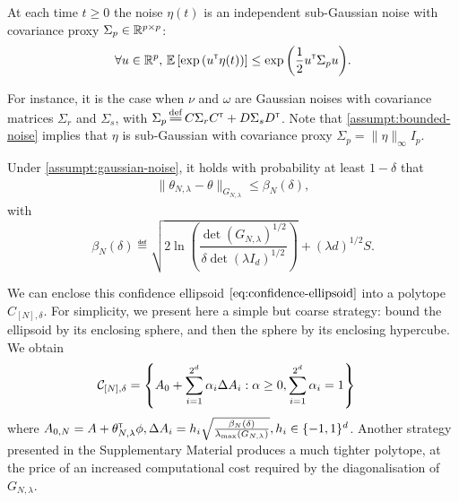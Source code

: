 \begin{assumption}
	\label{assumpt:gaussian-noise}
	\begin{leftbar}[assumptionbar]
	At each time $t\geq0$ the noise $\eta(t)$ is an independent sub-Gaussian noise with covariance proxy $\Sigma_p \in \mathbb{R}^{p\times p}$:
	\begin{equation*}
	\forall u\in\mathbb{R}^p,\, \operatorname*{\mathbb{E}} \left[ \exp{\left( u^{\mathsf{\scriptscriptstyle T}}\eta(t)\right)}\right] \leq \exp{\left( \frac{1}{2} u^{\mathsf{\scriptscriptstyle T}}\Sigma_p u\right)}.
	\end{equation*}
	\end{leftbar}
\end{assumption}
For instance, it is the case when $\nu$ and $\omega$ are Gaussian noises with covariance matrices $\Sigma_r$ and $\Sigma_s$, with $\Sigma_p \eqdef C\Sigma_r C^\transp + D\Sigma_s D^\transp$. Note that \autoref{assumpt:bounded-noise} implies that $\eta$ is sub-Gaussian with covariance proxy $\Sigma_p=\|\eta\|_\infty I_p$.

\begin{theorem}
	\label{thm:confidence_ellipsoid}
	\begin{leftbar}[theorembar]
	Under \autoref{assumpt:gaussian-noise}, it holds with probability at least $1-\delta$ that
	\begin{align}
	\label{eq:confidence-ellipsoid}
	\| \theta_{N,\lambda}  - \theta\|_{G_{N,\lambda}} \leq \beta_N(\delta),
	\end{align}
	with
	\begin{equation}
	\label{eq:beta_n}
	\beta_N(\delta)\eqdef \sqrt{2\ln \left(\frac{\det(G_{N,\lambda})^{1/2}}{\delta\det(\lambda I_d)^{1/2}}\right)}
	+ (\lambda d)^{1/2}S.
	\end{equation}
	\end{leftbar}
\end{theorem}

We can enclose this confidence ellipsoid $\eqref{eq:confidence-ellipsoid}$ into a polytope $C_{[N],\delta}$. For simplicity, we present here a simple but coarse strategy: bound the ellipsoid by its enclosing sphere, and then the sphere by its enclosing hypercube. We obtain
\begin{align}
\label{eq:polytope}
&\mathcal{C}_{[N],\delta} = \left\{ A_{0}+\sum_{i=1}^{2^d}\alpha_{i}\Delta A_{i}: \alpha\geq 0,  \sum_{i=1}^{2^d}\alpha_{i}=1\right\}
\end{align}
where $A_{0,N} = A + \theta_{N,\lambda}^{\mathsf{\scriptscriptstyle T}}\phi, \Delta A_{i} = {h_i} \sqrt{\frac{\beta_N(\delta)}{\lambda_{\max}(G_{N,\lambda})}}, h_i\in\{-1,1\}^d$. Another strategy presented in the Supplementary Material produces a much tighter polytope, at the price of an increased computational cost required by the diagonalisation of $G_{N,\lambda}$.


